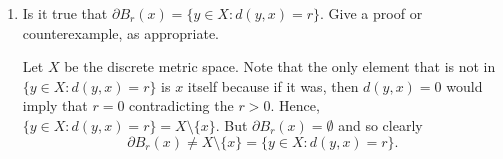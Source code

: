 \documentclass[a4paper]{article}
\begin{document}
\begin{problem}
\begin{enumerate}
\begin{proof}
    \end{proof}
\item[(iv)] Is it true that \( \partial {B}_{r}(x)  = \{  y \in X : d(y,x) = r  \} \). Give a proof or counterexample, as appropriate.
    \begin{solution}
    Let \( X  \) be the discrete metric space. Note that the only element that is not in \( \{ y \in X : d(y,x) = r  \}  \) is \( x  \) itself because if it was, then \( d(y,x) = 0  \) would imply that \( r = 0 \) contradicting the \( r > 0 \). Hence, \( \{ y \in X : d(y,x) = r  \} = X \setminus  \{ x  \}  \). But \( \partial {B}_{r}(x) = \emptyset \) and so clearly
    \[ \partial {B}_{r}(x) \neq X \setminus  \{ x  \} = \{ y \in X : d(y,x) = r  \}.    \]
\end{solution}
   \end{enumerate}
\end{problem}
\end{document}
